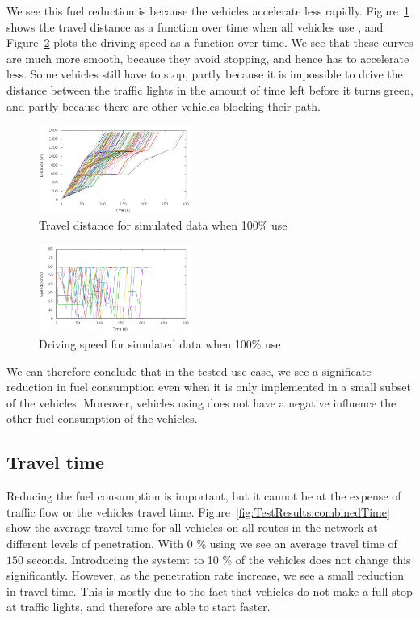 We see this fuel reduction is because the vehicles accelerate less rapidly. 
Figure~\ref{fig:TestResults:distance100} shows the travel distance as a function over time when all vehicles use \tech, and Figure~\ref{fig:TestResults:speed100} plots the driving speed as a function over time.
We see that these curves are much more smooth, because they avoid stopping, and hence has to accelerate less.
Some vehicles still have to stop, partly because it is impossible to drive the distance between the traffic lights in the amount of time left before it turns green, and partly because there are other vehicles blocking their path.
\begin{figure}[htb]
\includegraphics[width=0.45\textwidth]{../images/tp0c0_8/distanceControlled100.png}
\caption{Travel distance for simulated data when 100\% use \tech}
\label{fig:TestResults:distance100}
\end{figure}

\begin{figure}[htb]
\includegraphics[width=0.45\textwidth]{../images/tp0c0_8/speedControlled100.png}
\caption{Driving speed for simulated data when 100\% use \tech}
\label{fig:TestResults:speed100}
\end{figure}

We can therefore conclude that in the tested use case, we see a significate reduction in fuel consumption even when it is only implemented in a small subset of the vehicles. 
Moreover, vehicles using \tech does not have a negative influence the other fuel consumption of the vehicles.

\subsection{Travel time}
Reducing the fuel consumption is important, but it cannot be at the expense of traffic flow or the vehicles travel time.
Figure~\ref{fig:TestResults:combinedTime} show the average travel time for all vehicles on all routes in the network at different levels of penetration.
With 0 \% using \tech we see an average travel time of $150$ seconds. 
Introducing the systemt to 10 \% of the vehicles does not change this significantly. 
However, as the penetration rate increase, we see a small reduction in travel time. 
This is mostly due to the fact that vehicles do not make a full stop at traffic lights, and therefore are able to start faster.


